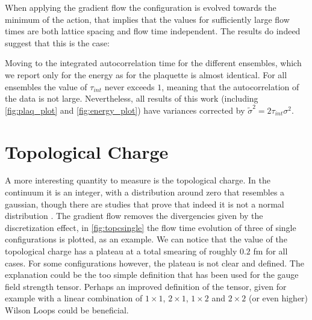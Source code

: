 When applying the gradient flow the configuration is evolved towards the minimum of the action, that implies that the values for sufficiently large flow times are both lattice spacing and flow time independent. The results do indeed suggest that this is the case:

Moving to the integrated autocorrelation time for the different ensembles, which we report only for the energy as for the plaquette is almost identical. For all ensembles the value of $\tau_{int}$ never exceeds $1$, meaning that the autocorrelation of the data is not large. Nevertheless, all results of this work (including \cref{fig:plaq_plot} and \cref{fig:energy_plot}) have variances corrected by $\tilde\sigma^2 = 2\tau_{int}\sigma^2$. 

\section{Topological Charge}
A more interesting quantity to measure is the topological charge. In the continuum it is an integer, with a distribution around zero that resembles a gaussian, though there are studies that prove that indeed it is not a normal distribution \cite{ce_non-gaussianities_2015}. The gradient flow removes the divergencies given by the discretization effect, in \cref{fig:topcsingle} the flow time evolution of three of single configurations is plotted, as an example. We can notice that the value of the topological charge has a plateau at a total smearing of roughly  $0.2$ fm for all cases.  
For some configurations however, the plateau is not clear and defined. The explanation could be the too simple definition that has been used for the gauge field strength tensor. Perhaps an improved definition of the tensor, given for example with a linear combination of $1\times 1$, $2\times 1$, $1\times 2$ and $2\times 2$ (or even higher) Wilson Loops could be beneficial.

